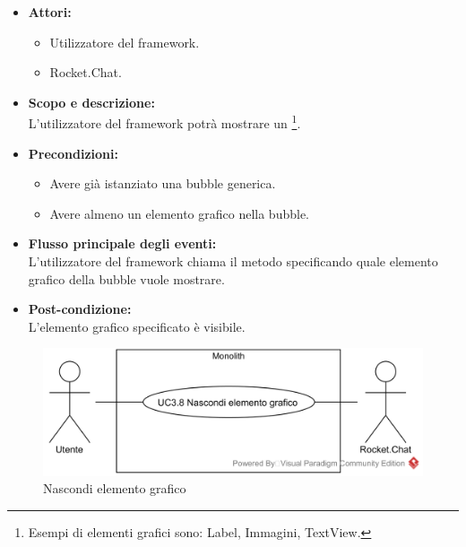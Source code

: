\begin{itemize}
	\item \textbf{Attori:}
	\begin{itemize}
		\item Utilizzatore del framework.
		\item Rocket.Chat.
	\end{itemize}
	\item \textbf{Scopo e descrizione:} 
	\\L'utilizzatore del framework potrà mostrare un \footnote{Esempi di elementi grafici sono: Label, Immagini, TextView.}.
	\item \textbf{Precondizioni:}
	\begin{itemize}
		\item Avere già istanziato una bubble generica.
		\item Avere almeno un elemento grafico nella bubble.
	\end{itemize}
	\item \textbf{Flusso principale degli eventi:}
	\\L'utilizzatore del framework chiama il metodo specificando quale elemento grafico della bubble vuole mostrare.
	\item \textbf{Post-condizione:}
	\\L'elemento grafico specificato è visibile.
\end{itemize}

\begin{samepage}
\nopagebreak
\begin{figure}[H]
	\centering
	\includegraphics[width=15cm]{../../documenti/AnalisiDeiRequisiti/Diagrammi_img/usecase/uc1_22.png}
	\caption{\UCFCaption{} Nascondi elemento grafico}
\end{figure}
\end{samepage}

